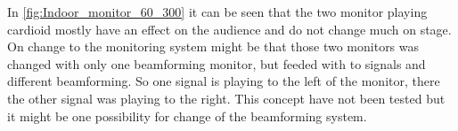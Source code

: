 In \autoref{fig:Indoor_monitor_60_300} it can be seen that the two monitor playing cardioid mostly have an effect on the audience and do not change much on stage. On change to the monitoring system might be that those two monitors was changed with only one beamforming monitor, but feeded with to signals and different beamforming. So one signal is playing to the left of the monitor, there the other signal was playing to the right. This concept have not been tested but it might be one possibility for change of the beamforming system.

